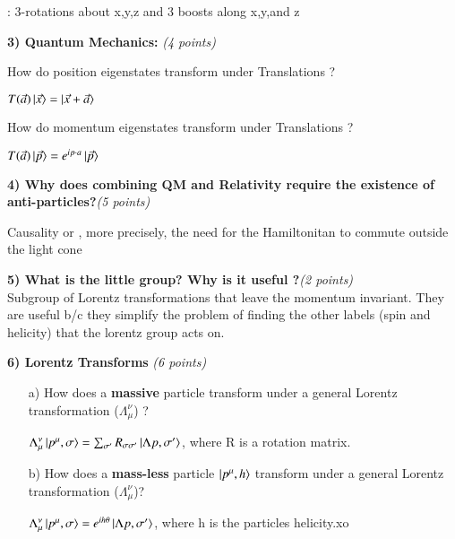 {:  3-rotations about x,y,z  and 3 boosts along x,y,and z
\ec


\textbf{3)  Quantum Mechanics:  }\hfill \textit{(4 points)}

How do position eigenstates transform under  Translations ?

 $T(\vec{a}) \ket{\vec{x}} = \ket{\vec{x} + \vec{a}} $


How do momentum eigenstates transform under Translations ?

 $T(\vec{a}) \ket{\vec{p}} = e^{ip\cdot a}\ket{\vec{p}} $

\vspace*{0.3in}

\textbf{4) Why does combining QM and Relativity require the existence of anti-particles?}\hfill \textit{(5 points)}


Causality or , more precisely,  the need for the Hamiltonitan to commute outside the light cone

\vspace*{0.3in}
\textbf{5) What is the little group? Why is it useful ?}\hfill \textit{(2 points)}\\

Subgroup of Lorentz transformations that leave the momentum invariant.
They are useful b/c they simplify the problem of finding the other labels (spin and helicity) that the lorentz group acts on.

\vspace*{0.3in}

\textbf{6) Lorentz Transforms } \hfill \textit{(6 points)}\\
\begin{itemize}
\item[a)] How does a \textbf{massive} particle transform under a general Lorentz transformation ($\Lambda_\mu^\nu$) ?

$\Lambda_\mu^\nu \ket{p^\mu,\sigma} = \sum_{\sigma'} R_{\sigma \sigma'} \ket{\Lambda p,\sigma'}$, where R is a rotation matrix.

\item[b)] How does a \textbf{mass-less} particle $\ket{p^\mu,h}$ transform under a general Lorentz transformation ($\Lambda_\mu^\nu$)?

$\Lambda_\mu^\nu \ket{p^\mu,\sigma} = e^{ih\theta} \ket{\Lambda p,\sigma'}$, where h is the particles helicity.xo
  
\end{itemize}



}
